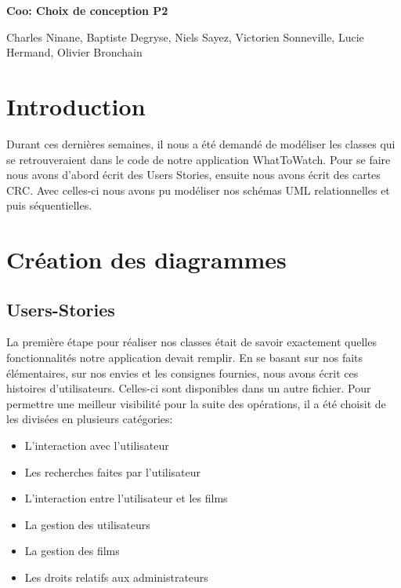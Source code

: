 \documentclass[10pt,a4paper]{article}
\begin{document}
\begin{center}

\Huge{\textbf{Coo: Choix de conception P2}}

 

\large{Charles Ninane, Baptiste Degryse, Niels Sayez, Victorien Sonneville, Lucie Hermand, Olivier Bronchain}

 

\end{center}

 

\section{Introduction}

    Durant ces dernières semaines, il nous a été demandé de modéliser les classes qui se retrouveraient dans le code de notre application WhatToWatch. Pour se faire nous avons d'abord écrit des Users Stories, ensuite nous avons écrit des cartes CRC. Avec celles-ci nous avons pu modéliser nos schémas UML relationnelles et puis séquentielles.

\section{Création des diagrammes}

\subsection{Users-Stories}

    La première étape pour réaliser nos classes était de savoir exactement quelles fonctionnalités notre application devait remplir. En se basant sur nos faits élémentaires, sur nos envies et les consignes fournies, nous avons écrit ces histoires d'utilisateurs. Celles-ci sont disponibles dans un autre fichier. Pour permettre une meilleur visibilité pour la suite des opérations, il a été choisit de les divisées en plusieurs catégories:

    \begin{itemize}

        \item L'interaction avec l'utilisateur

        \item Les recherches faites par l'utilisateur

        \item L'interaction entre l'utilisateur et les films

        \item La gestion des utilisateurs

        \item La gestion des films

        \item Les droits relatifs aux administrateurs

    \end{itemize}
\end{document}
